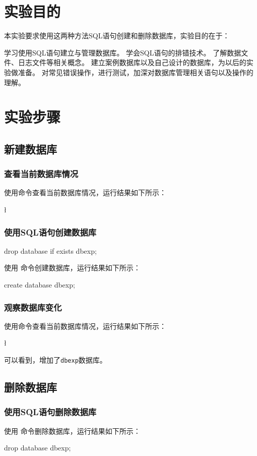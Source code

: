\documentclass{ctexrep}
\begin{document}
\section{实验目的}
本实验要求使用这两种方法SQL语句创建和删除数据库，实验目的在于：
\begin{outline}[enumerate]
    \1 学习使用SQL语句建立与管理数据库。
    \1 学会SQL语句的排错技术。
    \1 了解数据文件、日志文件等相关概念。
    \1 建立案例数据库以及自己设计的数据库，为以后的实验做准备。
    \1 对常见错误操作，进行测试，加深对数据库管理相关语句以及操作的理解。
\end{outline}
\section{实验步骤}
\subsection{新建数据库}
\subsubsection{查看当前数据库情况}
使用\sql{\l}命令查看当前数据库情况，运行结果如下所示：
\begin{run}
\l
\end{run}
\subsubsection{使用SQL语句创建数据库}
\begin{runsilent}
    drop database if exists dbexp;
\end{runsilent}
使用  命令创建数据库，运行结果如下所示：
\begin{run}
    create database dbexp;
\end{run}
\subsubsection{观察数据库变化}
使用\sql{\l}命令查看当前数据库情况，运行结果如下所示：
\begin{run}
\l
\end{run}
可以看到，增加了\texttt{dbexp}数据库。

\subsection{删除数据库}
\subsubsection{使用SQL语句删除数据库}
使用  命令删除数据库，运行结果如下所示：
\begin{run}
    drop database dbexp;
\end{run}
\end{document}
